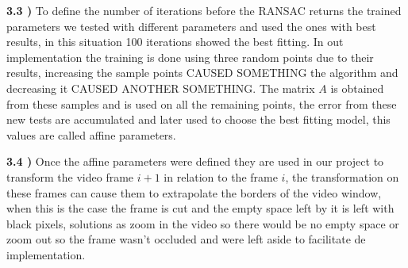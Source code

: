 \documentclass[12pt,a4paper]{article}
\begin{document}
\textbf{3.3 )} To define the number of iterations before the RANSAC returns the trained parameters we tested with different parameters and used the ones with best results, in this situation 100 iterations showed the best fitting. In out implementation the training is done using three random points due to their results, increasing the sample points CAUSED SOMETHING the algorithm and decreasing it CAUSED ANOTHER SOMETHING. The matrix $A$ is obtained from these samples and is used on all the remaining points, the error from these new tests are accumulated and later used to choose the best fitting model, this values are called affine parameters.
\par
\textbf{3.4 )} Once the affine parameters were defined they are used in our project to transform the video frame $i + 1$ in relation to the frame $i$, the transformation on these frames can cause them to extrapolate the borders of the video window, when this is the case the frame is cut and the empty space left by it is left with black pixels, solutions as zoom in the video so there would be no empty space or zoom out so the frame wasn't occluded and were left aside to facilitate de implementation.
\end{document}
